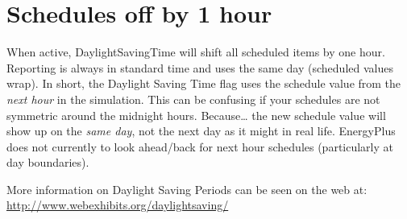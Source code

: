 \section{Schedules off by 1 hour}\label{schedules-off-by-1-hour}

When active, DaylightSavingTime will shift all scheduled items by one hour. Reporting is always in standard time and uses the same day (scheduled values wrap). In short, the Daylight Saving Time flag uses the schedule value from the \emph{next hour} in the simulation. This can be confusing if your schedules are not symmetric around the midnight hours. Because\ldots{} the new schedule value will show up on the \emph{same day}, not the next day as it might in real life. EnergyPlus does not currently to look ahead/back for next hour schedules (particularly at day boundaries).

More information on Daylight Saving Periods can be seen on the web at: \url{http://www.webexhibits.org/daylightsaving/}
